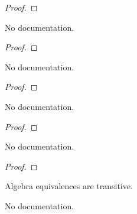 \begin{definition}
\begin{proof}
    \leanok
\end{proof}

\begin{theorem}\label{ValAlgEquiv.symm_bijective}
        \leanok
                No documentation.
    \end{theorem}

\begin{proof}
    \leanok
\end{proof}

\begin{theorem}\label{ValRingEquiv.symm_injective}
        \leanok
                No documentation.
    \end{theorem}

\begin{proof}
    \leanok
\end{proof}

\begin{theorem}\label{ValRingEquiv.symm_surjective}
        \leanok
                No documentation.
    \end{theorem}

\begin{proof}
    \leanok
\end{proof}

\begin{theorem}\label{ValRingEquiv.toEquiv_symm}
        \leanok
                No documentation.
    \end{theorem}

\begin{proof}
    \leanok
\end{proof}

\begin{definition}\label{ValAlgEquiv.trans}
        \leanok
                Algebra equivalences are transitive.
    \end{definition}

\begin{theorem}\label{ValAlgEquiv.coe_trans}
        \leanok
                No documentation.
    \end{theorem}


\end{definition}
